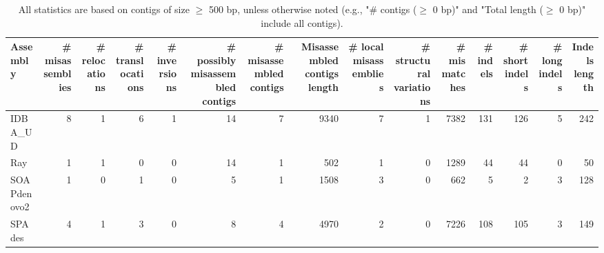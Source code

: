 \documentclass[12pt,a4paper]{article}
\begin{document}
\begin{table}[ht]
\begin{center}
\caption{All statistics are based on contigs of size $\geq$ 500 bp, unless otherwise noted (e.g., "\# contigs ($\geq$ 0 bp)" and "Total length ($\geq$ 0 bp)" include all contigs).}
\begin{tabular}{|l*{14}{|r}|}
\hline
Assembly & \# misassemblies &     \# relocations &     \# translocations &     \# inversions & \# possibly misassembled contigs & \# misassembled contigs & Misassembled contigs length & \# local misassemblies & \# structural variations & \# mismatches & \# indels &     \# short indels &     \# long indels & Indels length \\ \hline
IDBA\_UD & 8 & 1 & 6 & 1 & 14 & 7 & 9340 & 7 & 1 & 7382 & 131 & 126 & 5 & 242 \\ \hline
Ray & 1 & 1 & 0 & 0 & 14 & 1 & 502 & 1 & 0 & 1289 & 44 & 44 & 0 & 50 \\ \hline
SOAPdenovo2 & 1 & 0 & 1 & 0 & 5 & 1 & 1508 & 3 & 0 & 662 & 5 & 2 & 3 & 128 \\ \hline
SPAdes & 4 & 1 & 3 & 0 & 8 & 4 & 4970 & 2 & 0 & 7226 & 108 & 105 & 3 & 149 \\ \hline
\end{tabular}
\end{center}
\end{table}
\end{document}
